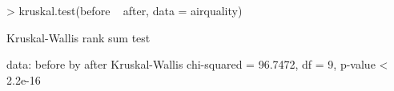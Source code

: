 \begin{Schunk}
\begin{Sinput}
> kruskal.test(before ~ after, data = airquality)
\end{Sinput}
\begin{Soutput}
	Kruskal-Wallis rank sum test

data:  before by after 
Kruskal-Wallis chi-squared = 96.7472, df = 9, p-value < 2.2e-16
\end{Soutput}
\end{Schunk}
